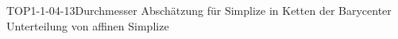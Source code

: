 
\begin{LEM}{TOP1-1-04-13}{Durchmesser Abschätzung für Simplize in Ketten der Barycenter Unterteilung von affinen Simplize}
\end{LEM}
